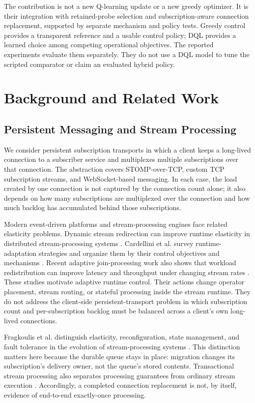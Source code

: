 \documentclass[manuscript]{acmart}
\begin{document}
The contribution is not a new Q-learning update or a new greedy optimizer.
It is their integration with retained-probe selection and subscription-aware
connection replacement, supported by separate mechanism and policy tests.
Greedy control provides a transparent reference and a usable control policy;
DQL provides a learned choice among competing operational objectives. The
reported experiments evaluate them separately. They do not use a DQL model
to tune the scripted comparator or claim an evaluated hybrid policy.

\section{Background and Related Work}

\subsection{Persistent Messaging and Stream Processing}

We consider persistent subscription transports in which a client keeps a
long-lived connection to a subscriber service and multiplexes multiple
subscriptions over that connection. The abstraction covers STOMP-over-TCP,
custom TCP subscription streams, and WebSocket-based messaging. In each case,
the load created by one connection is not captured by the connection count
alone; it also depends on how many subscriptions are multiplexed over the
connection and how much backlog has accumulated behind those subscriptions.

Modern event-driven platforms and stream-processing engines face related
elasticity problems. Dynamic stream redirection can improve runtime elasticity
in distributed stream-processing systems \cite{Liu2020DrStream}. Cardellini
et al. survey runtime-adaptation strategies and organize them by their control
objectives and mechanisms \cite{Cardellini2022DSPAdaptation}. Recent adaptive
join-processing work also shows that workload redistribution can improve
latency and throughput under changing stream rates \cite{Sun2024AjStream}.
These studies motivate adaptive runtime control. Their actions change
operator placement, stream routing, or stateful processing inside the stream
runtime. They do not address the client-side persistent-transport problem in
which subscription count and per-subscription backlog must be balanced across a
client's own long-lived connections.

Fragkoulis et al. distinguish elasticity, reconfiguration, state management,
and fault tolerance in the evolution of stream-processing systems
\cite{Fragkoulis2024StreamEvolution}. This distinction matters here because
the durable queue stays in place: migration changes its subscription's delivery
owner, not the queue's stored contents. Transactional stream processing also
separates processing guarantees from ordinary stream execution
\cite{Zhang2024TransactionalStreams}. Accordingly, a completed connection
replacement is not, by itself, evidence of end-to-end exactly-once processing.
\end{document}
